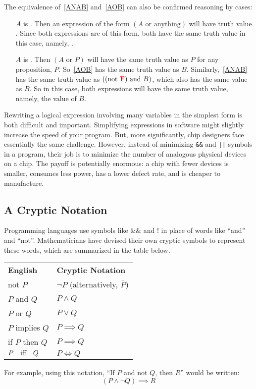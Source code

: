 The equivalence of~\eqref{ANAB} and~\eqref{AOB} can also be confirmed
reasoning by cases:
\begin{itemize}
\item[$A$ is \true.]  Then an expression of the form $(A \text{ or }
  \text{anything})$ will have truth value \true.  Since both expressions
  are of this form, both have the same truth value in this case, namely,
  \true.

\item[$A$ is \false.]  Then $(A \text{ or } P)$ will have the same truth
  value as $P$ for any proposition, $P$.  So~\eqref{AOB} has the same
  truth value as $B$.  Similarly,~\eqref{ANAB} has the same truth value as
  $((\text{not } \textcolor{red}{\mathbf{F}}) \text{ and } B)$, which also has the same value
  as $B$.  So in this case, both expressions will have the same truth
  value, namely, the value of $B$.
\end{itemize}

Rewriting a logical expression involving many variables in the
simplest form is both difficult and important.  Simplifying
expressions in software might slightly increase the speed of your
program.  But, more significantly, chip designers face essentially the
same challenge.  However, instead of minimizing \texttt{\&\&} and
\texttt{||} symbols in a program, their job is to minimize the number
of analogous physical devices on a chip.  The payoff is potentially
enormous: a chip with fewer devices is smaller, consumes less power,
has a lower defect rate, and is cheaper to manufacture.

\subsection{A Cryptic Notation}

Programming languages use symbols like $\&\&$ and $!$ in place of
words like ``and'' and ``not''.  Mathematicians have devised their own
cryptic symbols to represent these words, which are summarized in the
table below.
%
\begin{center}
\begin{tabular}{ll}
\textbf{English} & \textbf{Cryptic Notation} \\[1ex]
not $P$ & $\neg P$ \quad (alternatively, $\overline{P}$) \\
$P$ and $Q$ & $P \wedge Q$ \\
$P$ or $Q$ & $P \vee Q$ \\
$P$ implies $Q$ & $P \implies Q$ \\
if $P$ then $Q$ & $P \implies Q$ \\
$P \quad \text{iff} \quad Q$ & $P \iff Q$
\end{tabular}
\end{center}
%
For example, using this notation, ``If $P$ and not $Q$, then $R$''
would be written:
%
\[
(P \wedge \neg Q) \implies R
\]

